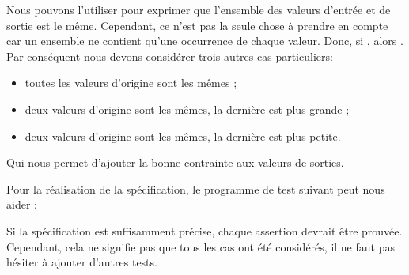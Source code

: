 Nous pouvons l'utiliser pour exprimer que l'ensemble des valeurs d'entrée et
de sortie est le même. Cependant, ce n'est pas la seule chose à prendre en
compte car un ensemble ne contient qu'une occurrence de chaque valeur. Donc,
si , alors .
Par conséquent nous devons considérer trois autres cas particuliers:


\begin{itemize}
\item toutes les valeurs d'origine sont les mêmes ;
\item deux valeurs d'origine sont les mêmes, la dernière est plus grande ;
\item deux valeurs d'origine sont les mêmes, la dernière est plus petite.
\end{itemize}


Qui nous permet d'ajouter la bonne contrainte aux valeurs de sorties.


Pour la réalisation de la spécification, le programme de test suivant peut
nous aider :




Si la spécification est suffisamment précise, chaque assertion devrait être
prouvée. Cependant, cela ne signifie pas que tous les cas ont été considérés,
il ne faut pas hésiter à ajouter d'autres tests.
